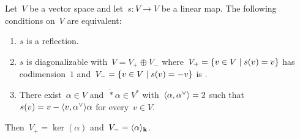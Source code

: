 \begin{lemma}
  Let~$V$ be a vector space and let~$s \colon V \to V$ be a linear map.
  The following conditions on~$V$ are equivalent:
  \begin{enumerate}
    \item
      \label{is a reflection}
      $s$ is a reflection.
    \item
      \label{is suitable diagonalizable}
      $s$ is diagonalizable with~$V = V_+ \oplus V_-$ where~$V_+ = \{v \in V \suchthat s(v) = v\}$ has codimension~$1$ and~$V_- = \{v \in V \suchthat s(v) = -v\}$ is {\onedimensional}.
    \item
      \label{existence of dual check}
      There exist~$\alpha \in V$ and~$\check*{\alpha} \in V^*$ with~$\pair{\alpha, \check{\alpha}} = 2$ such that~$s(v) = v - \pair{v, \check{\alpha}} \alpha$ for every~$v \in V$.
  \end{enumerate}
  Then~$V_+ = \ker(\alpha)$ and~$V_- = \langle\alpha\rangle_{\mathbf{k}}$.
\end{lemma}


